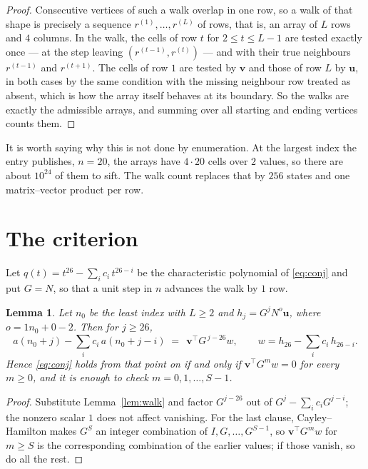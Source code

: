\documentclass[11pt,a4paper]{article}
\theoremstyle{plain}
\newtheorem{lemma}[theorem]{Lemma}
\theoremstyle{definition}
\begin{document}
\begin{proof}
Consecutive vertices of such a walk overlap in one row, so a walk of that shape is
precisely a sequence $r^{(1)},\dots,r^{(L)}$ of rows, that is, an array of $L$ rows
and $4$ columns. In the walk, the cells of row $t$ for $2\le t\le L-1$ are tested
exactly once --- at the step leaving $(r^{(t-1)},r^{(t)})$ --- and with their true
neighbours $r^{(t-1)}$ and $r^{(t+1)}$. The cells of row $1$ are tested by
$\mathbf{v}$ and those of row $L$ by $\mathbf{u}$, in both cases by the same condition
with the missing neighbour row treated as absent, which is how the array itself behaves at
its boundary. So the walks are exactly the admissible arrays, and summing over all starting
and ending vertices counts them.
\end{proof}


It is worth saying why this is not done by enumeration. At the largest index the entry
publishes, $n=20$, the arrays have $4\cdot20$ cells over
$2$ values, so there are about $10^{24}$ of them to sift. The
walk count replaces that by $256$ states and one matrix--vector product per row.
\section{The criterion}

Let $q(t)=t^{26}-\sum_i c_i\,t^{26-i}$ be the characteristic polynomial of
\eqref{eq:conj} and put $G=N$, so that a unit step in $n$ advances the walk by
$1$ row.

\begin{lemma}\label{lem:crit}
Let $n_0$ be the least index with $L\ge2$ and $h_j=G^{j}N^{o}\mathbf{u}$, where
$o=1n_0+0-2$. Then for $j\ge26$,
\[
a(n_0+j)-\sum_i c_i\,a(n_0+j-i)\;=\;\,\mathbf{v}^{\!\top}G^{\,j-26}w,
\qquad w=h_{26}-\sum_i c_i\,h_{26-i} .
\]
Hence \eqref{eq:conj} holds from that point on if and only if
$\mathbf{v}^{\!\top}G^{m}w=0$ for every $m\ge0$, and it is enough to check
$m=0,1,\dots,S-1$.
\end{lemma}

\begin{proof}
Substitute Lemma~\ref{lem:walk} and factor $G^{j-26}$ out of
$G^{j}-\sum_ic_iG^{j-i}$; the nonzero scalar $1$ does not affect
vanishing. For the last clause, Cayley--Hamilton makes $G^{S}$ an integer combination of
$I,G,\dots,G^{S-1}$, so $\mathbf{v}^{\!\top}G^{m}w$ for $m\ge S$ is the corresponding
combination of the earlier values; if those vanish, so do all the rest.
\end{proof}
\end{document}
